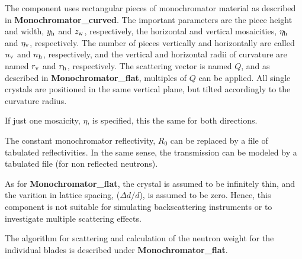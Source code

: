 The component uses  rectangular pieces of monochromator material
as described in {\bf Monochromator\_curved}.
The important parameters are the piece height and width,
$y_{\rm h}$ and $z_{\rm w}$, respectively, the
horizontal and vertical mosaicities, $\eta_{\rm h}$ and $\eta_{\rm v}$,
respectively. The number of pieces vertically and horizontally are called
$n_{\rm v}$ and $n_{\rm h}$, respectively, and the vertical and horizontal
radii of curvature are named $r_{\rm v}$ and $r_{\rm h}$, respectively.
The scattering vector is named $Q$, and as described in
{\bf Monochromator\_flat}, multiples of $Q$ can be applied.
All single crystals are positioned in the same vertical plane, but tilted accordingly to the curvature radius.

If just one mosaicity, $\eta$, is specified, this the same for
both directions.

The constant monochromator reflectivity, $R_0$ can be replaced by
a file of tabulated reflectivities. In the same sense, the transmission
can be modeled by a tabulated file (for non reflected neutrons).

As for {\bf Monochromator\_flat}, the crystal is assumed to be infinitely
thin, and the varition in lattice spacing, ($\Delta d/d$),
is assumed to be zero. Hence, this
component is not suitable for simulating backscattering instruments or to
investigate multiple scattering effects.

The algorithm for scattering and calculation of the neutron weight for
the individual blades is described under {\bf Monochromator\_flat}.